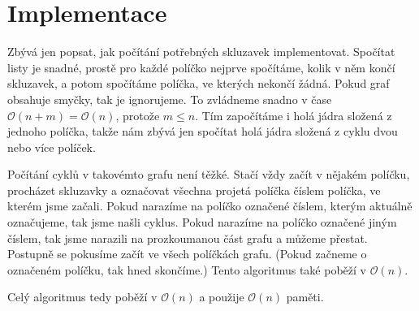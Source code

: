 \documentclass{article}
\begin{document}
\section{Implementace}

Zbývá jen popsat, jak počítání potřebných skluzavek implementovat. Spočítat listy je snadné, prostě pro každé políčko nejprve spočítáme, kolik v něm končí skluzavek, a potom spočítáme políčka, ve kterých nekončí žádná. Pokud graf obsahuje smyčky, tak je ignorujeme. To zvládneme snadno v čase $\mathcal{O}(n + m) = \mathcal{O}(n)$, protože $m \leq n$. Tím započítáme i holá jádra složená z jednoho políčka, takže nám zbývá jen spočítat holá jádra složená z cyklu dvou nebo více políček.

Počítání cyklů v takovémto grafu není těžké. Stačí vždy začít v nějakém políčku, procházet skluzavky a označovat všechna projetá políčka číslem políčka, ve kterém jsme začali. Pokud narazíme na políčko označené číslem, kterým aktuálně označujeme, tak jsme našli cyklus. Pokud narazíme na políčko označené jiným číslem, tak jsme narazili na prozkoumanou část grafu a můžeme přestat. Postupně se pokusíme začít ve všech políčkách grafu. (Pokud začneme o označeném políčku, tak hned skončíme.) Tento algoritmus také poběží v $\mathcal{O}(n)$.

Celý algoritmus tedy poběží v $\mathcal{O}(n)$ a použije $\mathcal{O}(n)$ paměti.
\end{document}

